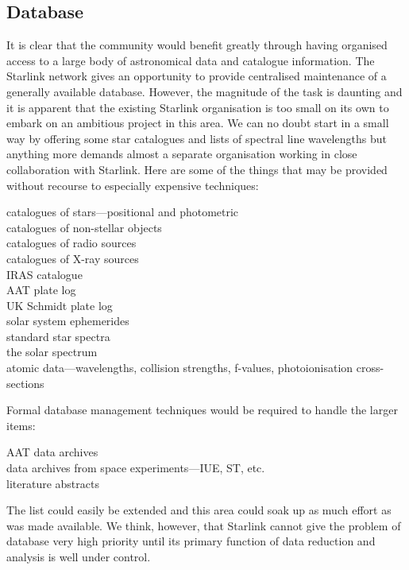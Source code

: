 \subsection {Database}
It is clear that the community would benefit greatly through having organised
access to a large body of astronomical data and catalogue information.
The Starlink network gives an opportunity to provide centralised maintenance of
a generally available database.
However, the magnitude of the task is daunting and it is apparent that the
existing Starlink organisation is too small on its own to embark on an ambitious
project in this area.
We can no doubt start in a small way by offering some star catalogues and
lists of spectral line wavelengths but anything more demands almost a separate
organisation working in close collaboration with Starlink.
Here are some of the things that may be provided without recourse to especially
expensive techniques:
\begin{description}
\begin{description}
\item [catalogues of stars---positional and photometric]
\item [catalogues of non-stellar objects]
\item [catalogues of radio sources]
\item [catalogues of X-ray sources]
\item [IRAS catalogue]
\item [AAT plate log]
\item [UK Schmidt plate log]
\item [solar system ephemerides]
\item [standard star spectra]
\item [the solar spectrum]
\item [atomic data---wavelengths, collision strengths, f-values,
photoionisation cross-sections]
\end{description}
\end{description}
Formal database management techniques would be required to handle the larger
items:
\begin{description}
\begin{description}
\item [AAT data archives]
\item [data archives from space experiments---IUE, ST, etc.]
\item [literature abstracts]
\end{description}
\end{description}
The list could easily be extended and this area could soak up as much effort as
was made available.
We think, however, that Starlink cannot give the problem of database very high
priority until its primary function of data reduction and analysis is well under
control.
